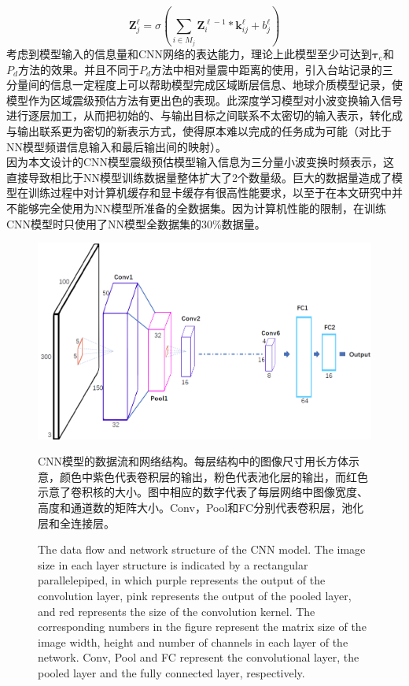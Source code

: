 \begin{equation}
\mathbf{Z}_{j}^{\ell}=\sigma\left(\sum_{i \in M_{j}} \mathbf{Z}_{i}^{\ell-1} * \mathbf{k}_{i j}^{\ell}+b_{j}^{\ell}\right)
\end{equation}
\indent 考虑到模型输入的信息量和CNN网络的表达能力，理论上此模型至少可达到$\mathbf{\tau}_{\mathrm{c}}$和$P_{d}$方法的效果。并且不同于$P_{d}$方法中相对量震中距离的使用，引入台站记录的三分量间的信息一定程度上可以帮助模型完成区域断层信息、地球介质模型记录，使模型作为区域震级预估方法有更出色的表现。此深度学习模型对小波变换输入信号进行逐层加工，从而把初始的、与输出目标之间联系不太密切的输入表示，转化成与输出联系更为密切的新表示方式，使得原本难以完成的任务成为可能（对比于NN模型频谱信息输入和最后输出间的映射）。\\
\indent 因为本文设计的CNN模型震级预估模型输入信息为三分量小波变换时频表示，这直接导致相比于NN模型训练数据量整体扩大了2个数量级。巨大的数据量造成了模型在训练过程中对计算机缓存和显卡缓存有很高性能要求，以至于在本文研究中并不能够完全使用为NN模型所准备的全数据集。因为计算机性能的限制，在训练CNN模型时只使用了NN模型全数据集的30\%数据量。\\
\begin{figure}[!h] 
\centering 
 \includegraphics[width=0.99\linewidth]{img/CNN-paper.jpg}
 \renewcommand{\figurename}{图} 
\caption{CNN模型的数据流和网络结构。每层结构中的图像尺寸用长方体示意，颜色中紫色代表卷积层的输出，粉色代表池化层的输出，而红色示意了卷积核的大小。图中相应的数字代表了每层网络中图像宽度、高度和通道数的矩阵大小。Conv，Pool和FC分别代表卷积层，池化层和全连接层。} 
\addtocounter{figure}{-1} \vspace{-5pt} 
\renewcommand{\figurename}{Fig} 
\caption{The data flow and network structure of the CNN model. The image size in each layer structure is indicated by a rectangular parallelepiped, in which purple represents the output of the convolution layer, pink represents the output of the pooled layer, and red represents the size of the convolution kernel. The corresponding numbers in the figure represent the matrix size of the image width, height and number of channels in each layer of the network. Conv, Pool and FC represent the convolutional layer, the pooled layer and the fully connected layer, respectively.} 
\renewcommand{\figurename}{图} 
\label{fig:network-device-influence.png} 
\end{figure}
